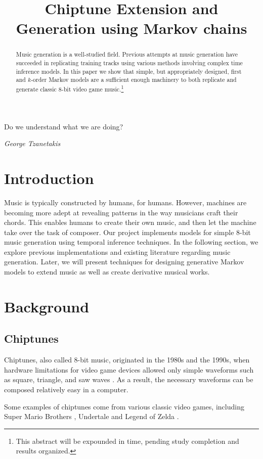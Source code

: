 \documentclass{article}
\title{Chiptune Extension and Generation using Markov chains}
\begin{document}
\maketitle

\epigraph{Do we understand what we are doing?}{\textit{George Tzanetakis}}

\begin{abstract}
Music generation is a well-studied field. Previous attempts at music generation have succeeded in replicating training tracks using various methods involving complex 
time inference models. In this paper we show that simple, but appropriately designed, first and $k$-order Markov models are a sufficient enough machinery to both 
replicate and generate classic 8-bit video game music.\footnote{This abstract will be expounded in time, pending study completion and results organized.}
\end{abstract}

\section{Introduction}
Music is typically constructed by humans, for humans. However, machines are becoming more adept at revealing patterns in the way musicians craft their chords. 
This enables humans to create their own music, and then let the machine take over the task of composer. Our project implements models for simple 8-bit music 
generation using temporal inference techniques. In the following section, we explore previous implementations and existing literature regarding music generation. 
Later, we will present techniques for designing generative Markov models to extend music as well as create derivative musical works.

\section{Background}
\subsection{Chiptunes}
Chiptunes, also called 8-bit music, originated in the 1980s and the 1990s, when hardware limitations for video game devices allowed only simple waveforms such as 
square, triangle, and saw waves \cite{pop_chiptunes}.  As a result, the necessary waveforms can be composed relatively easy in a computer. 

Some examples of chiptunes come from various classic video games, including Super Mario Brothers \cite{kondo_2009}, Undertale \cite{fox_2017} and 
Legend of Zelda \cite{nakatsuka_2009}.
\end{document}
